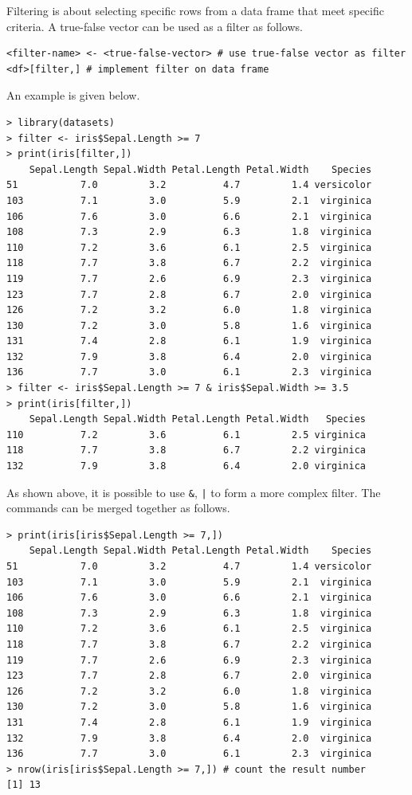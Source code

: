 Filtering is about selecting specific rows from a data frame that meet specific criteria. A true-false vector can be used as a filter as follows.
\begin{lstlisting}
<filter-name> <- <true-false-vector> # use true-false vector as filter
<df>[filter,] # implement filter on data frame
\end{lstlisting}
An example is given below.
\begin{lstlisting}
> library(datasets)
> filter <- iris$Sepal.Length >= 7
> print(iris[filter,])
    Sepal.Length Sepal.Width Petal.Length Petal.Width    Species
51           7.0         3.2          4.7         1.4 versicolor
103          7.1         3.0          5.9         2.1  virginica
106          7.6         3.0          6.6         2.1  virginica
108          7.3         2.9          6.3         1.8  virginica
110          7.2         3.6          6.1         2.5  virginica
118          7.7         3.8          6.7         2.2  virginica
119          7.7         2.6          6.9         2.3  virginica
123          7.7         2.8          6.7         2.0  virginica
126          7.2         3.2          6.0         1.8  virginica
130          7.2         3.0          5.8         1.6  virginica
131          7.4         2.8          6.1         1.9  virginica
132          7.9         3.8          6.4         2.0  virginica
136          7.7         3.0          6.1         2.3  virginica
> filter <- iris$Sepal.Length >= 7 & iris$Sepal.Width >= 3.5
> print(iris[filter,])
    Sepal.Length Sepal.Width Petal.Length Petal.Width   Species
110          7.2         3.6          6.1         2.5 virginica
118          7.7         3.8          6.7         2.2 virginica
132          7.9         3.8          6.4         2.0 virginica
\end{lstlisting}
As shown above, it is possible to use \verb|&|, \verb$|$ to form a more complex filter. The commands can be merged together as follows.
\begin{lstlisting}
> print(iris[iris$Sepal.Length >= 7,])
    Sepal.Length Sepal.Width Petal.Length Petal.Width    Species
51           7.0         3.2          4.7         1.4 versicolor
103          7.1         3.0          5.9         2.1  virginica
106          7.6         3.0          6.6         2.1  virginica
108          7.3         2.9          6.3         1.8  virginica
110          7.2         3.6          6.1         2.5  virginica
118          7.7         3.8          6.7         2.2  virginica
119          7.7         2.6          6.9         2.3  virginica
123          7.7         2.8          6.7         2.0  virginica
126          7.2         3.2          6.0         1.8  virginica
130          7.2         3.0          5.8         1.6  virginica
131          7.4         2.8          6.1         1.9  virginica
132          7.9         3.8          6.4         2.0  virginica
136          7.7         3.0          6.1         2.3  virginica
> nrow(iris[iris$Sepal.Length >= 7,]) # count the result number
[1] 13
\end{lstlisting}


